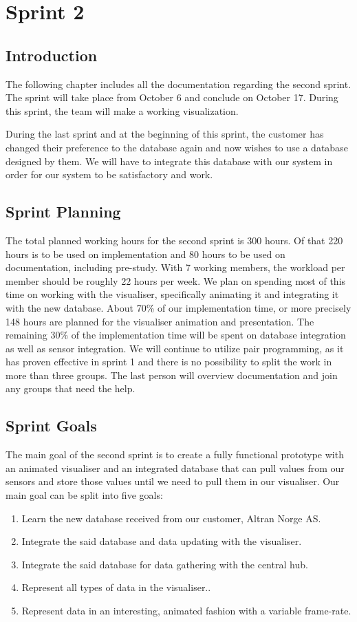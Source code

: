 \documentclass[../document]{subfiles}
\begin{document}
\section{Sprint 2}
\subsection{Introduction}
The following chapter includes all the documentation regarding the second sprint. The sprint will take place from October 6 and conclude on October 17. During this sprint, the team will make a working visualization.

During the last sprint and at the beginning of this sprint, the customer has changed their preference to the database again and now wishes to use a database designed by them. We will have to integrate this database with our system in order for our system to be satisfactory and work.

\subsection{Sprint Planning}
The total planned working hours for the second sprint is 300 hours. Of that 220 hours is to be used on implementation and 80 hours to be used on documentation, including pre-study. With 7 working members, the workload per member should be roughly 22 hours per week. We plan on spending most of this time on working with the visualiser, specifically animating it and integrating it with the new database. About 70\% of our implementation time, or more precisely 148 hours are planned for the visualiser animation and presentation. The remaining 30\% of the implementation time will be spent on database integration as well as sensor integration. We will continue to utilize pair programming, as it has proven effective in sprint 1 and there is no possibility to split the work in more than three groups. The last person will overview documentation and join any groups that need the help. 

\subsection{Sprint Goals}
The main goal of the second sprint is to create a fully functional prototype with an animated visualiser and an integrated database that can pull values from our sensors and store those values until we need to pull them in our visualiser. Our main goal can be split into five goals:
\begin{enumerate}
\item
Learn the new database received from our customer, \gls{Altran} Norge AS.
\item
Integrate the said database and data updating with the visualiser.
\item
Integrate the said database for data gathering with the central hub.
\item
Represent all types of data in the visualiser..
\item
Represent data in an interesting, animated fashion with a variable frame-rate.
\end{enumerate}
\end{document}
